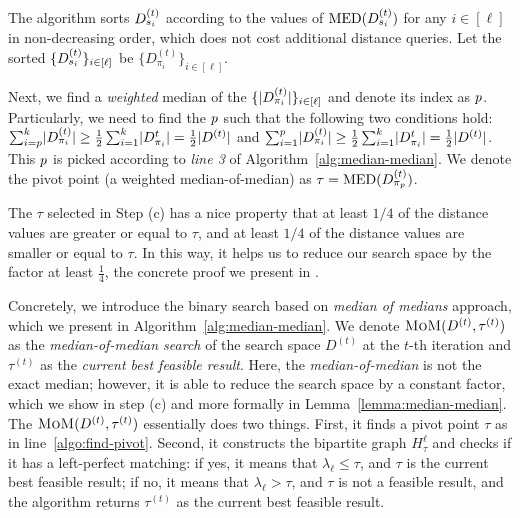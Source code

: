 The algorithm sorts $D_{s_i}^{(t)}$ according to the values of $\operatorname{MED}(D_{s_i}^{(t)})$ for any $i \in [\ell]$ in non-decreasing order, which does not cost additional distance queries.  
Let the sorted $\{D_{s_i}^{(t)}\}_{i \in [\ell]}$ be $\{D_{\pi_i}^{(t)}\}_{i \in [\ell]}$.

Next, we find a \emph{weighted} median of the $\{\lvert D_{\pi_i}^{(t)} \rvert \}_{i \in [\ell]}$ and denote its index as $p$. 
Particularly, we need to find the $p$ such that the following two conditions hold:
$\sum_{i=p}^{k} \lvert D_{\pi_i}^{(t)} \rvert  \geq \frac{1}{2}\sum_{i=1}^k \lvert D_{\pi_i}^{{t}} \rvert  = \frac{1}{2} \lvert D^{(t)} \rvert $ and $\sum_{i=1}^{p} \lvert D_{\pi_i}^{(t)} \rvert  \geq \frac{1}{2}\sum_{i=1}^k \lvert D_{\pi_i}^{{t}} \rvert  = \frac{1}{2} \lvert D^{(t)} \rvert $.
This $p$ is picked according to \emph{line 3} of Algorithm~\ref{alg:median-median}.
We denote the pivot point (a weighted median-of-median) as $\tau = \operatorname{MED}(D_{\pi_{p}}^{(t)})$. 

The $\tau$ selected in Step (c) has a nice property that at least $1/4$ of the distance values are greater or equal to $\tau$, and at least $1/4$ of the distance values are smaller or equal to $\tau$. In this way, it helps us to reduce our search space by the factor at least $\frac{1}{4}$,
the concrete proof we present in . 

\smallskip 

Concretely, we introduce the {binary search} based on \emph{median of medians} approach, which we present in Algorithm~\ref{alg:median-median}.
We denote $\textsc{MoM}(D^{(t)}, \tau^{(t)})$ as the \emph{median-of-median search} of the search space $D^{(t)}$ at the $t$-th iteration and $\tau^{(t)}$ as the \emph{current best feasible result}. 
Here, the \emph{median-of-median} is not the exact median; however, it is able to reduce the search space by a constant factor, which we show in step (c) and more formally in Lemma~\ref{lemma:median-median}.
The $\textsc{MoM}(D^{(t)}, \tau^{(t)})$ essentially does two things. First, it finds a pivot point $\tau$ as in line~\ref{algo:find-pivot}. Second, it constructs the bipartite graph $H^{\ell}_{\tau}$ and checks if it has a left-perfect matching: if yes, it means that $\lambda_{\ell} \leq \tau$, and $\tau$ is the current best feasible result; if no, it means that $\lambda_{\ell} > \tau$, and $\tau$ is not a feasible result, and the algorithm returns $\tau^{(t)}$ as the current best feasible result.

